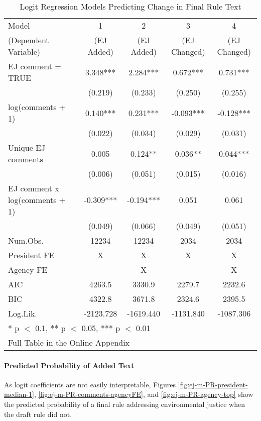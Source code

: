 \documentclass[
      12pt,
        ]{article}
\begin{document}
\begin{table}[H]
\centering
\caption{\label{tab:tables}Logit Regression Models Predicting Change in Final Rule Text}

\begin{tabular}[t]{lcccc}
\toprule
Model  & 1 & 2 & 3 & 4\\
(Dependent Variable)  & (EJ Added) & (EJ Added) & (EJ Changed) & (EJ Changed)\\
\midrule
EJ comment = TRUE & 3.348*** & 2.284*** & 0.672*** & 0.731***\\
 & (0.219) & (0.233) & (0.250) & (0.255)\\
log(comments + 1) & 0.140*** & 0.231*** & -0.093*** & -0.128***\\
 & (0.022) & (0.034) & (0.029) & (0.031)\\
Unique EJ comments & 0.005 & 0.124** & 0.036** & 0.044***\\
 & (0.006) & (0.051) & (0.015) & (0.016)\\
EJ comment x log(comments + 1) & -0.309*** & -0.194*** & 0.051 & 0.061\\
 & (0.049) & (0.066) & (0.049) & (0.051)\\
\midrule
Num.Obs. & 12234 & 12234 & 2034 & 2034\\
President FE & X & X & X & X\\
Agency FE &  & X &  & X\\
AIC & 4263.5 & 3330.9 & 2279.7 & 2232.6\\
BIC & 4322.8 & 3671.8 & 2324.6 & 2395.5\\
Log.Lik. & -2123.728 & -1619.440 & -1131.840 & -1087.306\\
\bottomrule
\multicolumn{5}{l}{\textsuperscript{} * p $<$ 0.1, ** p $<$ 0.05, *** p $<$ 0.01}\\
\multicolumn{5}{l}{\textsuperscript{} Full Table in the Online Appendix}\\
\end{tabular}
\end{table}

\hypertarget{predicted-probability-of-added-text}{%
\paragraph{Predicted Probability of Added Text}\label{predicted-probability-of-added-text}}

As logit coefficients are not easily interpretable, Figures \ref{fig:ej-m-PR-president-median-1}, \ref{fig:ej-m-PR-comments-agencyFE}, and \ref{fig:ej-m-PR-agency-top} show the predicted probability of a final rule addressing environmental justice when the draft rule did not.
\end{document}
